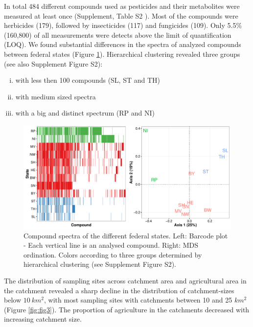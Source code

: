 \documentclass[journal=esthag,manuscript=article]{achemso}
\begin{document}
In total 484 different compounds used as pesticides and their metabolites were measured at least once (Supplement, Table S2 ). 
Most of the compounds were herbicides (179), followed by insecticides (117) and fungicides (109).
Only 5.5\% (160,800) of all measurements were detects above the limit of quantification (LOQ).
We found substantial differences in the spectra of analyzed compounds between federal states (Figure \ref{fig:fig2}).
Hierarchical clustering revealed three groups (see also Supplement Figure S2):

\begin{enumerate}[i)]
	\item with less then 100 compounds (SL, ST and TH)
	\item with medium sized spectra
	\item with a big and distinct spectrum (RP and NI)
\end{enumerate}


\begin{figure}[ht]
  \includegraphics[width=\textwidth]{figure2.pdf}
  \caption{Compound spectra of the different federal states. Left: Barcode plot - Each vertical line is an analysed compound. Right: MDS ordination. 
  Colors according to three groups determined by hierarchical clustering (see Supplement Figure S2).}
  \label{fig:fig2}
\end{figure}

The distribution of sampling sites across catchment area and agricultural area in the catchment revealed a sharp decline in the distribution of catchment-sizes below $10~km^2$, with most sampling sites with catchments between 10 and 25 $km^2$ (Figure \ref{fig:fig3}).
The proportion of agriculture in the catchments decreased with increasing catchment size.
\end{document}
